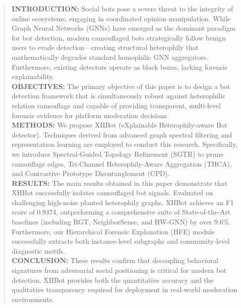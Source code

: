 \begin{abstract}
\textbf{INTRODUCTION:} Social bots pose a severe threat to the integrity of online ecosystems, engaging in coordinated opinion manipulation. While Graph Neural Networks (GNNs) have emerged as the dominant paradigm for bot detection, modern camouflaged bots strategically follow benign users to evade detection—creating structural heterophily that mathematically degrades standard homophilic GNN aggregators. Furthermore, existing detectors operate as black boxes, lacking forensic explainability. \\
\textbf{OBJECTIVES:} The primary objective of this paper is to design a bot detection framework that is simultaneously robust against heterophilic relation camouflage and capable of providing transparent, multi-level forensic evidence for platform moderation decisions. \\
\textbf{METHODS:} We propose XHBot (eXplainable Heterophily-aware Bot detector). Techniques derived from advanced graph spectral filtering and representation learning are employed to conduct this research. Specifically, we introduce Spectral-Guided Topology Refinement (SGTR) to prune camouflage edges, Tri-Channel Heterophily-Aware Aggregation (THCA), and Contrastive Prototype Disentanglement (CPD). \\
\textbf{RESULTS:} The main results obtained in this paper demonstrate that XHBot successfully isolates camouflaged bot signals. Evaluated on challenging high-noise planted heterophily graphs, XHBot achieves an F1 score of 0.9474, outperforming a comprehensive suite of State-of-the-Art baselines (including RGT, NeighborSense, and HW-GNN) by over 9.6\%. Furthermore, our Hierarchical Forensic Explanation (HFE) module successfully extracts both instance-level subgraphs and community-level diagnostic motifs. \\
\textbf{CONCLUSION:} These results confirm that decoupling behavioral signatures from adversarial social positioning is critical for modern bot detection. XHBot provides both the quantitative accuracy and the qualitative transparency required for deployment in real-world moderation environments.
\end{abstract}

